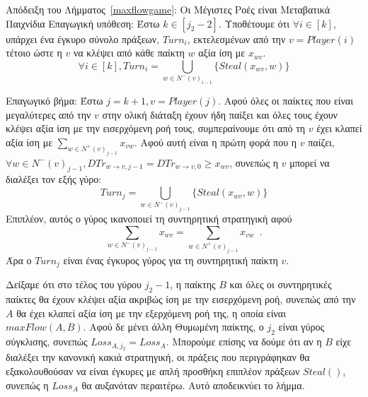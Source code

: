 \begin{sepproof}{Απόδειξη του Λήμματος~\ref{maxflowgame}: Οι Μέγιστες Ροές είναι Μεταβατικά Παιχνίδια}
  Επαγωγική υπόθεση: Έστω $k \in [j_2 - 2]$. Υποθέτουμε ότι $\forall i \in [k]$, υπάρχει ένα έγκυρο σύνολο πράξεων, $Turn_i$,
  εκτελεσμένων από την $v = Player\left(i\right)$ τέτοιο ώστε η $v$ να κλέψει από κάθε παίκτη $w$ αξία ίση με $x_{wv}$.
  \begin{equation*}
    \forall i \in [k], Turn_i = \bigcup\limits_{w \in N^{-}\left(v\right)_{i-1}}\{Steal\left(x_{wv}, w\right)\}
  \end{equation*}

  Επαγωγικό βήμα: Έστω $j = k + 1, v = Player\left(j\right)$. Αφού όλες οι παίκτες που είναι μεγαλύτερες από την $v$ στην
  ολική διάταξη έχουν ήδη παίξει και όλες τους έχουν κλέψει αξία ίση με την εισερχόμενη ροή τους, συμπεραίνουμε ότι από τη $v$
  έχει κλαπεί αξία ίση με $\sum\limits_{w \in N^{+}\left(v\right)_{j-1}}x_{vw}$. Αφού αυτή είναι η πρώτη φορά που η $v$
  παίζει, $\forall w \in N^{-}\left(v\right)_{j-1}, DTr_{w \rightarrow v, j-1} = DTr_{w \rightarrow v, 0} \geq x_{wv}$,
  συνεπώς η $v$ μπορεί να διαλέξει τον εξής γύρο:
  \begin{equation*}
    Turn_j = \bigcup\limits_{w \in N^{-}\left(v\right)_{j-1}}\{Steal\left(x_{wv}, w\right)\}
  \end{equation*}
  Επιπλέον, αυτός ο γύρος ικανοποιεί τη συντηρητική στρατηγική αφού
  \begin{equation*}
    \sum\limits_{w \in N^{-}\left(v\right)_{j-1}}x_{wv} = \sum\limits_{w \in N^{+}\left(v\right)_{j-1}}x_{vw} \enspace.
  \end{equation*}
  Άρα ο $Turn_j$ είναι ένας έγκυρος γύρος για τη συντηρητική παίκτη $v$.

  Δείξαμε ότι στο τέλος του γύρου $j_2 - 1$, η παίκτης $B$ και όλες οι συντηρητικές παίκτες θα έχουν κλέψει αξία ακριβώς ίση
  με την εισερχόμενη ροή, συνεπώς από την $A$ θα έχει κλαπεί αξία ίση με την εξερχόμενη ροή της, η οποία είναι
  $maxFlow\left(A, B\right)$. Αφού δε μένει άλλη Θυμωμένη παίκτης, ο $j_2$ είναι γύρος σύγκλισης, συνεπώς $Loss_{A, j_2} =
  Loss_A$. Μπορούμε επίσης να δούμε ότι αν η $B$ είχε διαλέξει την κανονική κακιά στρατηγική, οι πράξεις που περιγράφηκαν θα
  εξακολουθούσαν να είναι έγκυρες με απλή προσθήκη επιπλέον πράξεων $Steal\left(\right)$, συνεπώς η $Loss_A$ θα αυξανόταν
  περαιτέρω. Αυτό αποδεικνύει το λήμμα.
\end{sepproof}
